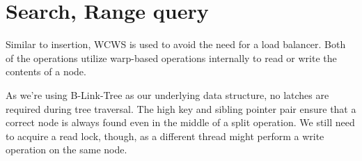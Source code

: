 \section{Search, Range query}

Similar to insertion, WCWS is used to avoid the need for a load balancer. Both of the operations utilize warp-based operations internally to read or write the contents of a node.

As we're using B-Link-Tree as our underlying data structure, no latches are required during tree traversal. The high key and sibling pointer pair ensure that a correct node is always found even in the middle of a split operation. We still need to acquire a read lock, though, as a different thread might perform a write operation on the same node.